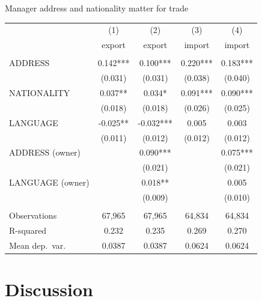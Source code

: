 \documentclass[
  ignorenonframetext,
  aspectratio=43,
]{beamer}
\begin{document}
\begin{frame}{Manager address and nationality matter for trade}
\protect\hypertarget{manager-address-and-nationality-matter-for-trade}{}
\begin{tabular}{lcccc} \hline
& (1) & (2) & (3) & (4) \\
& export & export & import & import \\ \hline
&  &  &  &  \\
ADDRESS & 0.142*** & 0.100*** & 0.220*** & 0.183*** \\
& (0.031) & (0.031) & (0.038) & (0.040) \\
NATIONALITY & 0.037** & 0.034* & 0.091*** & 0.090*** \\
& (0.018) & (0.018) & (0.026) & (0.025) \\
LANGUAGE & -0.025** & -0.032*** & 0.005 & 0.003 \\
& (0.011) & (0.012) & (0.012) & (0.012) \\
ADDRESS (owner) &  & 0.090*** &  & 0.075*** \\
&  & (0.021) &  & (0.021) \\
LANGUAGE (owner) &  & 0.018** &  & 0.005 \\
&  & (0.009) &  & (0.010) \\
&  &  &  &  \\
Observations & 67,965 & 67,965 & 64,834 & 64,834 \\
R-squared & 0.232 & 0.235 & 0.269 & 0.270 \\
Mean dep.~var.& 0.0387 & 0.0387 & 0.0624 & 0.0624 \\ \hline
\end{tabular}
\end{frame}

\hypertarget{discussion}{%
\section{Discussion}\label{discussion}}
\end{document}
